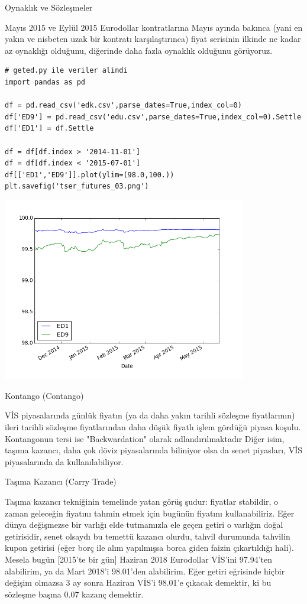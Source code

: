 \documentclass[12pt,fleqn]{article}\usepackage{../../common}
\begin{document}
Oynaklık ve Sözleşmeler

Mayıs 2015 ve Eylül 2015 Eurodollar kontratlarına Mayıs ayında bakınca (yani en
yakın ve nisbeten uzak bir kontratı karşılaştırınca) fiyat serisinin ilkinde ne
kadar az oynaklığı olduğunu, diğerinde daha fazla oynaklık olduğunu görüyoruz.

\begin{verbatim}
# geted.py ile veriler alindi
import pandas as pd

df = pd.read_csv('edk.csv',parse_dates=True,index_col=0)
df['ED9'] = pd.read_csv('edu.csv',parse_dates=True,index_col=0).Settle
df['ED1'] = df.Settle

df = df[df.index > '2014-11-01']
df = df[df.index < '2015-07-01']
df[['ED1','ED9']].plot(ylim=(98.0,100.))
plt.savefig('tser_futures_03.png')
\end{verbatim}

\includegraphics[height=8cm]{tser_futures_03.png}

Kontango (Contango)

VİS piyasalarında günlük fiyatın (ya da daha yakın tarihli sözleşme
fiyatlarının) ileri tarihli sözleşme fiyatlarından daha düşük fiyatlı işlem
gördüğü piyasa koşulu.  Kontangonun tersi ise "Backwardation" olarak
adlandırılmaktadır Diğer isim, taşıma kazancı, daha çok döviz piyasalarında
biliniyor olsa da senet piyasları, VİS piyasalarında da kullanılabiliyor.

Taşıma Kazancı (Carry Trade)

Taşıma kazancı tekniğinin temelinde yatan görüş şudur: fiyatlar stabildir, o
zaman geleceğin fiyatını tahmin etmek için bugünün fiyatını kullanabiliriz. Eğer
dünya değişmezse bir varlığı elde tutmamızla ele geçen getiri o varlığın doğal
getirisidir, senet olsaydı bu temettü kazancı olurdu, tahvil durumunda tahvilin
kupon getirisi (eğer borç ile alım yapılmışsa borca giden faizin çıkartıldığı
hali). Mesela bugün [2015'te bir gün] Haziran 2018 Eurodollar VİS'ini 97.94'ten
alabilirim, ya da Mart 2018'i 98.01'den alabilirim. Eğer getiri eğrisinde hiçbir
değişim olmazsa 3 ay sonra Haziran VİS'i 98.01'e çıkacak demektir, ki bu
sözleşme başına 0.07 kazanç demektir.
\end{document}
